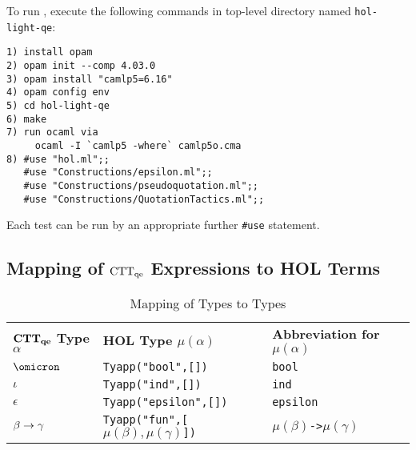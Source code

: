 \documentclass[fleqn]{llncs}
\begin{document}
To run {\HLQE}, execute the following commands in {\HLQE} top-level
directory named \texttt{hol-light-qe}:

\begin{lstlisting}
1) install opam
2) opam init --comp 4.03.0                                                      
3) opam install "camlp5=6.16" 
4) opam config env
5) cd hol-light-qe
6) make
7) run ocaml via                                                                
     ocaml -I `camlp5 -where` camlp5o.cma                                        
8) #use "hol.ml";;
   #use "Constructions/epsilon.ml";;
   #use "Constructions/pseudoquotation.ml";;
   #use "Constructions/QuotationTactics.ml";;
\end{lstlisting}
\noindent Each test can be run by an appropriate further
\lstinline|#use| statement.

\subsection{Mapping of ${\rm CTT_{qe}}$ Expressions to HOL Terms}\label{subsec:mapping}

\begin{table}[b]
\bc
\begin{tabular}{|lll|}
\hline
\textbf{${\bf CTT_{qe}}$ Type $\alpha$} \hspace*{2ex}
  & \textbf{HOL Type $\mu(\alpha)$}
  & \textbf{Abbreviation for $\mu(\alpha)$}\\
$\omicron$ & \texttt{Tyapp("bool",[])} & \texttt{bool}\\
$\iota$ & \texttt{Tyapp("ind",[])} & \texttt{ind}\\
$\epsilon$ & \texttt{Tyapp("epsilon",[])} & \texttt{epsilon}\\
$\beta \rightarrow \gamma$ 
  & \texttt{Tyapp("fun",[\mbox{$\mu(\beta),\mu(\gamma)$}])} \hspace*{2ex}
  & \texttt{\mbox{$\mu(\beta)$}->\mbox{$\mu(\gamma)$}}\\  
\hline
\end{tabular}
\ec
\caption{Mapping of {\churchqe} Types to {\HOL} Types}\label{tab:types} 
\end{table}
\end{document}
